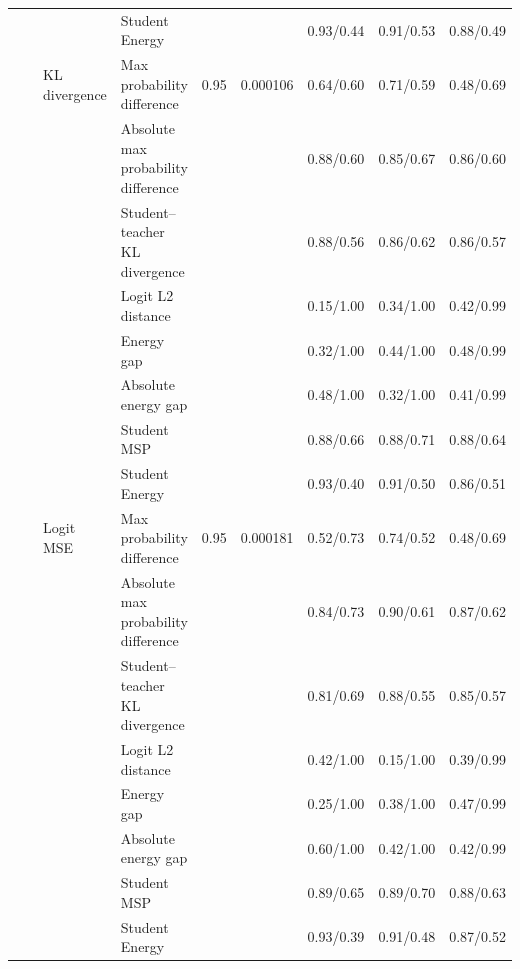 \documentclass[border=2pt]{standalone}
\begin{document}
\begin{tabular}{llllccccc}
 &  &  & Student Energy &  &  & 0.93/0.44 & 0.91/0.53 & 0.88/0.49 \\
\addlinespace
 &  & KL divergence & Max probability difference & 0.95 & 0.000106 & 0.64/0.60 & 0.71/0.59 & 0.48/0.69 \\
 &  &  & Absolute max probability difference &  &  & 0.88/0.60 & 0.85/0.67 & 0.86/0.60 \\
 &  &  & Student--teacher KL divergence &  &  & 0.88/0.56 & 0.86/0.62 & 0.86/0.57 \\
 &  &  & Logit L2 distance &  &  & 0.15/1.00 & 0.34/1.00 & 0.42/0.99 \\
 &  &  & Energy gap &  &  & 0.32/1.00 & 0.44/1.00 & 0.48/0.99 \\
 &  &  & Absolute energy gap &  &  & 0.48/1.00 & 0.32/1.00 & 0.41/0.99 \\
 &  &  & Student MSP &  &  & 0.88/0.66 & 0.88/0.71 & 0.88/0.64 \\
 &  &  & Student Energy &  &  & 0.93/0.40 & 0.91/0.50 & 0.86/0.51 \\
\addlinespace
 &  & Logit MSE & Max probability difference & 0.95 & 0.000181 & 0.52/0.73 & 0.74/0.52 & 0.48/0.69 \\
 &  &  & Absolute max probability difference &  &  & 0.84/0.73 & 0.90/0.61 & 0.87/0.62 \\
 &  &  & Student--teacher KL divergence &  &  & 0.81/0.69 & 0.88/0.55 & 0.85/0.57 \\
 &  &  & Logit L2 distance &  &  & 0.42/1.00 & 0.15/1.00 & 0.39/0.99 \\
 &  &  & Energy gap &  &  & 0.25/1.00 & 0.38/1.00 & 0.47/0.99 \\
 &  &  & Absolute energy gap &  &  & 0.60/1.00 & 0.42/1.00 & 0.42/0.99 \\
 &  &  & Student MSP &  &  & 0.89/0.65 & 0.89/0.70 & 0.88/0.63 \\
 &  &  & Student Energy &  &  & 0.93/0.39 & 0.91/0.48 & 0.87/0.52 \\
\bottomrule
\end{tabular}
\end{document}
